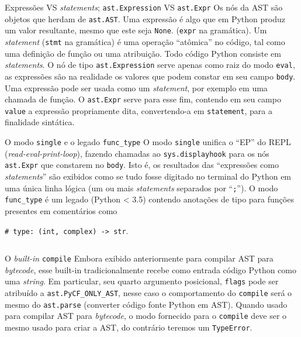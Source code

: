 \documentclass[utf8]{beamer}
\begin{document}
\begin{frame}{Expressões VS \emph{statements};
              \texttt{ast.Expression} VS
              \texttt{ast.Expr}}
  Os nós da AST são objetos que herdam de \texttt{ast.AST}.
  \vfill
  Uma expressão é algo que em Python produz um valor resultante, mesmo
  que este seja \texttt{None}.
  (\texttt{expr} na gramática).
  \vfill
  Um \emph{statement} (\texttt{stmt} na gramática)
  é uma operação ``atômica'' no código,
  tal como uma definição de função ou uma atribuição.
  Todo código Python consiste em \emph{statements}.
  \vfill
  O nó de tipo \texttt{ast.Expression} serve apenas
  como raiz do modo \texttt{eval},
  as expressões são na realidade os valores que podem constar
  em seu campo \texttt{body}.
  \vfill
  Uma expressão pode ser usada como um \emph{statement},
  por exemplo em uma chamada de função.
  O \texttt{ast.Expr} serve para esse fim,
  contendo em seu campo \texttt{value} a expressão propriamente dita,
  convertendo-a em \texttt{statement}, para a finalidade sintática.
\end{frame}


\begin{frame}[fragile]{O modo \texttt{single}
                       e o legado \texttt{func\_type}}
  O modo \texttt{single}
  unifica o ``EP'' do REPL (\emph{read-eval-print-loop}),
  fazendo chamadas ao \texttt{sys.displayhook}
  para os nós \texttt{ast.Expr}
  que constarem no \texttt{body}.
  Isto é, os resultados das ``expressões como \emph{statements}''
  são exibidos como se tudo fosse digitado no terminal do Python
  em uma única linha lógica
  (um ou mais \emph{statements} separados por ``\texttt{;}'').
  \vfill
  O modo \texttt{func\_type} é um legado (Python < 3.5)
  contendo anotações de tipo para funções
  presentes em comentários como

  \texttt{# type: (int, complex) -> str}.
  \vspace{-.8em}%
  \inputminted{console}{func_type_console.txt}
\end{frame}


\begin{frame}[fragile]{O \emph{built-in} \texttt{compile}}
  Embora exibido anteriormente para compilar AST para \emph{bytecode},
  esse built-in tradicionalmente recebe como entrada
  código Python como uma \emph{string}.
  Em particular, seu quarto argumento posicional, \texttt{flags}
  pode ser atribuído a \texttt{ast.PyCF_ONLY_AST},
  nesse caso o comportamento do \texttt{compile}
  será o mesmo do \texttt{ast.parse}
  (converter código fonte Python em AST).
  \vfill
  Quando usado para compilar AST para \emph{bytecode},
  o modo fornecido para o \texttt{compile}
  deve ser o mesmo usado para criar a AST,
  do contrário teremos um \texttt{TypeError}.
\end{frame}
\end{document}
